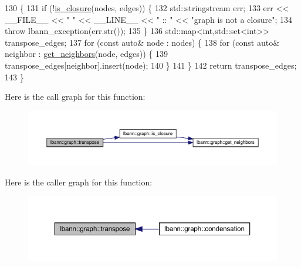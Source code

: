 \begin{DoxyCode}
130                                                                             \{
131   \textcolor{keywordflow}{if} (!\hyperlink{namespacelbann_1_1graph_ac9c1819b38f8bc514ab24ac8778f840b}{is\_closure}(nodes, edges)) \{
132     std::stringstream err;
133     err << \_\_FILE\_\_ << \textcolor{stringliteral}{" "} << \_\_LINE\_\_ << \textcolor{stringliteral}{" :: "} << \textcolor{stringliteral}{"graph is not a closure"};
134     \textcolor{keywordflow}{throw} lbann\_exception(err.str());
135   \}
136   std::map<int,std::set<int>> transpose\_edges;
137   \textcolor{keywordflow}{for} (\textcolor{keyword}{const} \textcolor{keyword}{auto}& node : nodes) \{
138     \textcolor{keywordflow}{for} (\textcolor{keyword}{const} \textcolor{keyword}{auto}& neighbor : \hyperlink{namespacelbann_1_1graph_ad305e0d104d25d9cb1e63a4b93c0847c}{get\_neighbors}(node, edges)) \{
139       transpose\_edges[neighbor].insert(node);
140     \}
141   \}
142   \textcolor{keywordflow}{return} transpose\_edges;
143 \}
\end{DoxyCode}
Here is the call graph for this function\+:\nopagebreak
\begin{figure}[H]
\begin{center}
\leavevmode
\includegraphics[width=350pt]{namespacelbann_1_1graph_a53b0b97c3fc0b88f2fffd44f1b951c71_cgraph}
\end{center}
\end{figure}
Here is the caller graph for this function\+:\nopagebreak
\begin{figure}[H]
\begin{center}
\leavevmode
\includegraphics[width=350pt]{namespacelbann_1_1graph_a53b0b97c3fc0b88f2fffd44f1b951c71_icgraph}
\end{center}
\end{figure}
